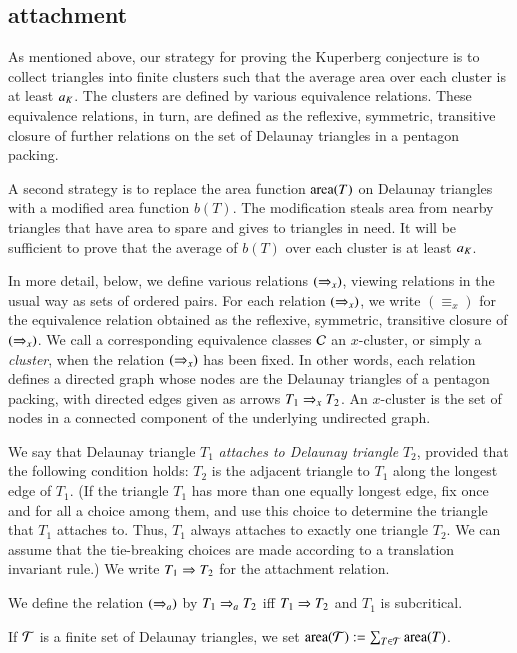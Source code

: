 \subsection{attachment}

As mentioned above, our strategy for proving the Kuperberg conjecture
is to collect triangles into finite clusters such that the average
area over each cluster is at least $a_K$.  The clusters are defined by
various equivalence relations.  These equivalence relations, in turn,
are defined as the reflexive, symmetric, transitive closure of further
relations on the set of Delaunay triangles in a pentagon packing.

A second strategy is to replace the area function ${\operatorname{area}}(T)$ on Delaunay
triangles with a modified area function $b(T)$.  The modification steals area from
nearby triangles that have area to spare and gives to triangles in need.  It will 
be sufficient to prove that the average of $b(T)$ over each cluster is at least $a_K$.


In more detail, below, we define various relations $(\Rightarrow_{x})$, viewing
relations in the usual way as sets of ordered pairs.  For each
relation $(\Rightarrow_{x})$, we write ${(\equiv_{x})}$ for the equivalence
relation obtained as the reflexive, symmetric, transitive closure of
$(\Rightarrow_{x})$.  We call a corresponding equivalence classes $\mathcal C$ an
$x$-cluster, or simply a {\it cluster}, when the relation $(\Rightarrow_{x})$
has been fixed.  In other words, each relation defines a directed
graph whose nodes are the Delaunay triangles of a pentagon packing,
with directed edges given as arrows $T_1\Rightarrow_{x} T_2$.  An $x$-cluster
is the set of nodes in a connected component of the underlying
undirected graph.

We say that Delaunay triangle $T_1$ {\it attaches to Delaunay
  triangle} $T_2$, provided that the following condition holds: $T_2$
is the adjacent triangle to $T_1$ along the longest edge of $T_1$.
(If the triangle $T_1$ has more than one equally longest edge, fix
once and for all a choice among them, and use this choice to determine
the triangle that $T_1$ attaches to.  Thus, $T_1$ always attaches to
exactly one triangle $T_2$.  We can assume that the tie-breaking
choices are made according to a translation invariant rule.)  We write
$T_1 \Rightarrow T_2$ for the attachment relation.


We define the relation $(\Rightarrow_{a})$ by $T_1 \Rightarrow_{a} T_2$ iff
$T_1\Rightarrow T_2$ and $T_1$ is subcritical.

If $\mathcal T$ is a finite set of Delaunay triangles, we set ${\operatorname{area}}(\mathcal T):=\sum_{T\in\mathcal T} {\operatorname{area}}(T)$.

